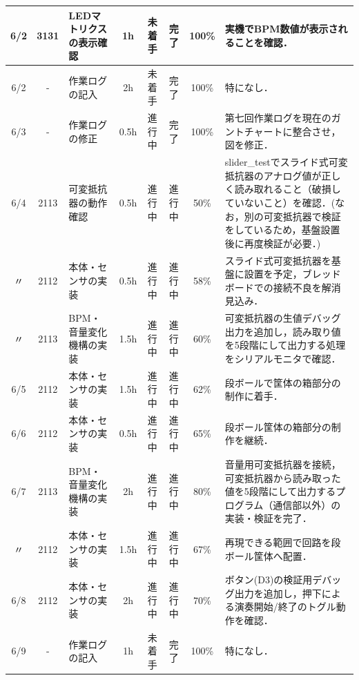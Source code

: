 \documentclass[uplatex,dvipdfmx,a4paper,11pt]{jsarticle}
\begin{document}
\begin{longtable}{|c|c|p{2.4cm}|c|c|c|c|p{3.8cm}|}
    6/2 & 3131 & LEDマトリクスの表示確認 & 1h &
    未着手 &
    完了 &
    100\% &
    実機でBPM数値が表示されることを確認． \\
    \hline

    6/2 & - & 作業ログの記入 & 2h &
    未着手 &
    完了 &
    100\% &
    特になし． \\
    \hline

    6/3 & - & 作業ログの修正 & 0.5h &
    進行中 &
    完了 &
    100\% &
    第七回作業ログを現在のガントチャートに整合させ，図を修正． \\
    \hline

    6/4 & 2113 & 可変抵抗器の動作確認 & 0.5h &
    進行中 &
    進行中 &
    50\% &
    slider\_testでスライド式可変抵抗器のアナログ値が正しく読み取れること（破損していないこと）を確認．(なお，別の可変抵抗器で検証をしているため，基盤設置後に再度検証が必要．) \\
    \hline

    〃 & 2112 & 本体・センサの実装 & 0.5h &
    進行中 &
    進行中 &
    58\% &
    スライド式可変抵抗器を基盤に設置を予定，ブレッドボードでの接続不良を解消見込み． \\
    \hline

    〃 & 2113 & BPM・音量変化機構の実装 & 1.5h &
    進行中 &
    進行中 &
    60\% &
    可変抵抗器の生値デバッグ出力を追加し，読み取り値を5段階にして出力する処理をシリアルモニタで確認． \\
    \hline

    6/5 & 2112 & 本体・センサの実装 & 1.5h &
    進行中 &
    進行中 &
    62\% &
    段ボールで筐体の箱部分の制作に着手． \\
    \hline

    6/6 & 2112 & 本体・センサの実装 & 0.5h &
    進行中 &
    進行中 &
    65\% &
    段ボール筐体の箱部分の制作を継続． \\
    \hline

    6/7 & 2113 & BPM・音量変化機構の実装 & 2h &
    進行中 &
    進行中 &
    80\% &
    音量用可変抵抗器を接続，可変抵抗器から読み取った値を5段階にして出力するプログラム（通信部以外）の実装・検証を完了． \\
    \hline

    〃 & 2112 & 本体・センサの実装 & 1.5h &
    進行中 &
    進行中 &
    67\% &
    再現できる範囲で回路を段ボール筐体へ配置． \\
    \hline

    6/8 & 2112 & 本体・センサの実装 & 2h &
    進行中 &
    進行中 &
    70\% &
    ボタン(D3)の検証用デバッグ出力を追加し，押下による演奏開始/終了のトグル動作を確認． \\
    \hline
    

    6/9 & - & 作業ログの記入 & 1h &
    未着手 &
    完了 &
    100\% &
    特になし． \\

    \end{longtable}
\end{document}
